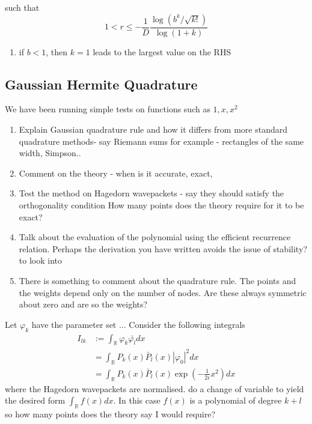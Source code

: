 \documentclass[12pt]{article}
\numberwithin{equation}{section}
\begin{document}
  such that 
  \begin{equation}
    1 < r \leq - \frac{1}{D} \frac{\log (b^k / \sqrt{k!})}{\log(1+k)}
  \end{equation}
  \begin{enumerate}
    \item if $b < 1$, then $k=1$ leads to the largest value on the RHS
  \end{enumerate}
  \begin{figure}[h!]
    \centering 
    
  \end{figure} 
  \subsection{Gaussian Hermite Quadrature}
  We have been running simple tests on functions such as 
  $1,x,x^2$
  \begin{enumerate}
    \item Explain Gaussian quadrature rule and how it differs from more 
      standard quadrature methods- say Riemann sums for example - rectangles 
      of the same width, Simpson..
    \item Comment on the theory - when is it accurate, exact, 
    \item Test the method on Hagedorn wavepackets - 
      say they should satisfy the orthogonality condition 
      How many points does the theory require for it to be exact?
    \item Talk about the evaluation of the polynomial using the 
      efficient recurrence relation. Perhaps the derivation you have 
      written avoids the issue of stability? to look into
    \item There is something to comment about the quadrature rule. 
      The points and the weights depend only on the number of nodes. 
      Are these always symmetric about zero and are so the weights?
  \end{enumerate}
  Let $\varphi_k$ have the parameter set ...
  Consider the following integrals 
  \begin{equation}
    \begin{split}
      I_{lk} 
      &:= 
      \int_{\mathbb{R}}
      \varphi_k \bar{\varphi_l}
      dx
      \\
      &=
      \int_{\mathbb{R}}
      P_{k}(x)\bar{P}_l(x)
      |\varphi_0|^2 dx
      \\
      &=
      \int_{\mathbb{R}}
      P_{k}(x)\bar{P}_l(x)
      \exp\left(
        -\frac{1}{2\epsilon}
        x^2
      \right) dx
    \end{split}
  \end{equation}
  where the Hagedorn wavepackets are normalised.
  do a change of variable to yield the desired form
  $\int_{\mathbb{R}}f(x) dx $. In this case $f(x)$ is 
  a polynomial of degree $k+l$ so how many points 
  does the theory say I would require?
\end{document}
